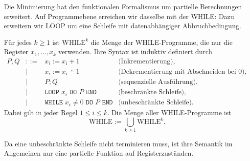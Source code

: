 Die Minimierung hat den funktionalen Formalismus um partielle Berechnungen
erweitert. Auf Programmebene erreichen wir dasselbe mit der \acf{WHILE}: Dazu
erweitern wir LOOP um eine Schleife mit datenabhängiger Abbruchbedingung.
\begin{Def}\label{def:WHILE-Programme}
  Für jedes $k\geq1$ ist $\mathrm{WHILE}^k$ die Menge der WHILE-Programme, die
  nur die Register $x_1,\dots,x_k$ verwenden. Ihre Syntax ist induktiv
  definiert durch
  \[
    \begin{array}{rcll}
      P,Q &::=& x_i := x_i+1
      & \text{(Inkrementierung)},\\
          &\mid& x_i := x_i\dotminus 1
      & \text{(Dekrementierung mit Abschneiden bei $0$)},\\
          &\mid& P;Q
      & \text{(sequenzielle Ausführung)},\\
          &\mid& \texttt{LOOP }x_i\texttt{ DO }P\texttt{ END}
      & \text{(beschränkte Schleife)},\\
          &\mid& \texttt{WHILE }x_i\ne0\texttt{ DO }P\texttt{ END}
                 & \text{(unbeschränkte Schleife)}.
    \end{array}
  \]
  Dabei gilt in jeder Regel $1\leq i\leq k$. Die Menge aller WHILE-Programme ist
  \[
    \mathrm{WHILE}:=\bigcup_{k\geq1}\mathrm{WHILE}^k.
  \]
\end{Def}
Da eine unbeschränkte Schleife nicht terminieren muss, ist ihre Semantik im
Allgemeinen nur eine partielle Funktion auf Registerzuständen.
